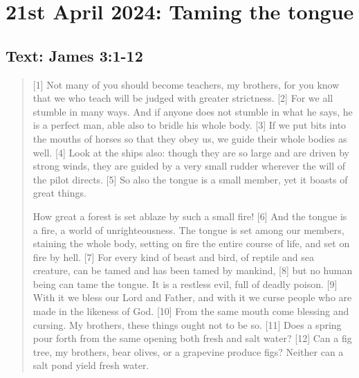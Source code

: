 \setcounter{figure}{0}

\section{21st April 2024: Taming the tongue}
\subsection*{Text: James 3:1-12}
  \begin{quote}
    [1] Not many of you should become teachers, my brothers, for you know
    that we who teach will be judged with greater strictness. [2] For we all
    stumble in many ways. And if anyone does not stumble in what he says, he
    is a perfect man, able also to bridle his whole body. [3] If we put bits
    into the mouths of horses so that they obey us, we guide their whole
    bodies as well. [4] Look at the ships also: though they are so large and
    are driven by strong winds, they are guided by a very small rudder
    wherever the will of the pilot directs. [5] So also the tongue is a small
    member, yet it boasts of great things.

    How great a forest is set ablaze by such a small fire! [6] And the tongue
    is a fire, a world of unrighteousness. The tongue is set among our
    members, staining the whole body, setting on fire the entire course of
    life, and set on fire by hell. [7] For every kind of beast and bird, of
    reptile and sea creature, can be tamed and has been tamed by mankind, [8]
    but no human being can tame the tongue. It is a restless evil, full of
    deadly poison. [9] With it we bless our Lord and Father, and with it we
    curse people who are made in the likeness of God. [10] From the same
    mouth come blessing and cursing. My brothers, these things ought not to
    be so. [11] Does a spring pour forth from the same opening both fresh and
    salt water? [12] Can a fig tree, my brothers, bear olives, or a grapevine
    produce figs? Neither can a salt pond yield fresh water.
  \end{quote}
